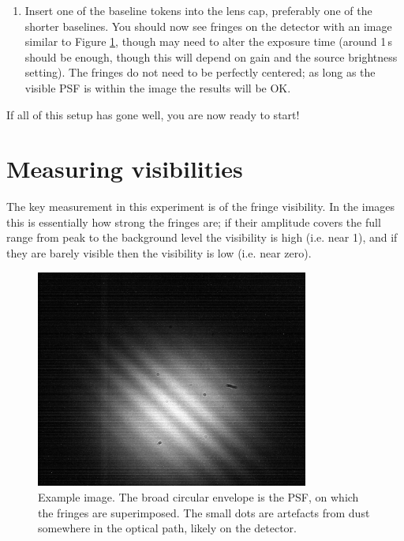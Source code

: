 \documentclass[11pt]{article}
\begin{document}
\begin{enumerate}
    \item Insert one of the baseline tokens into the lens cap, preferably one of the shorter baselines. You should now see fringes on the detector with an image similar to Figure \ref{fig:det-img}, though may need to alter the exposure time (around 1\,s should be enough, though this will depend on gain and the source brightness setting). The fringes do not need to be perfectly centered; as long as the visible PSF is within the image the results will be OK.
\end{enumerate}

If all of this setup has gone well, you are now ready to start!

\clearpage
\section{Measuring visibilities}\label{sec:meas}

The key measurement in this experiment is of the fringe visibility. In the images this is essentially how strong the fringes are; if their amplitude covers the full range from peak to the background level the visibility is high (i.e. near 1), and if they are barely visible then the visibility is low (i.e. near zero).

\begin{figure}[h]
    \centering
    \includegraphics[width=0.8\textwidth]{doc/det-img.png}
    \caption{Example image. The broad circular envelope is the PSF, on which the fringes are superimposed. The small dots are artefacts from dust somewhere in the optical path, likely on the detector.}
    \label{fig:det-img}
\end{figure}
\end{document}
